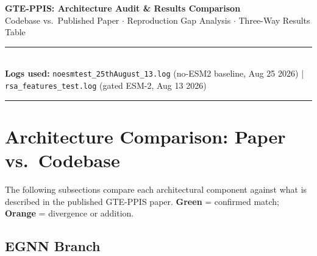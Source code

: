 \documentclass[10pt, a4paper]{article}
\newcommand{\match}[1]{\textcolor{okgreen}{\textbf{#1}}}
\newcommand{\mismatch}[1]{\textcolor{warnorange}{\textbf{#1}}}
\newcommand{\code}[1]{\texttt{\small #1}}
\begin{document}

\begin{center}
    {\LARGE \bfseries \color{primaryblue} GTE-PPIS: Architecture Audit \& Results Comparison}\\[4pt]
    {\large \color{secondaryblue}
        Codebase vs.\ Published Paper $\cdot$
        Reproduction Gap Analysis $\cdot$
        Three-Way Results Table}\\[6pt]
    \rule{\textwidth}{1pt}\\[5pt]
    \textbf{Logs used:}
    \code{noesmtest\_25thAugust\_13.log} (no-ESM2 baseline, Aug 25 2026) \quad|\quad
    \code{rsa\_features\_test.log} (gated ESM-2, Aug 13 2026)
    \rule{\textwidth}{0.5pt}
\end{center}

\vspace{4pt}

\section{Architecture Comparison: Paper vs.\ Codebase}

The following subsections compare each architectural component against
what is described in the published GTE-PPIS paper.
\match{Green} = confirmed match; \mismatch{Orange} = divergence or addition.

\subsection{EGNN Branch}
\end{document}
